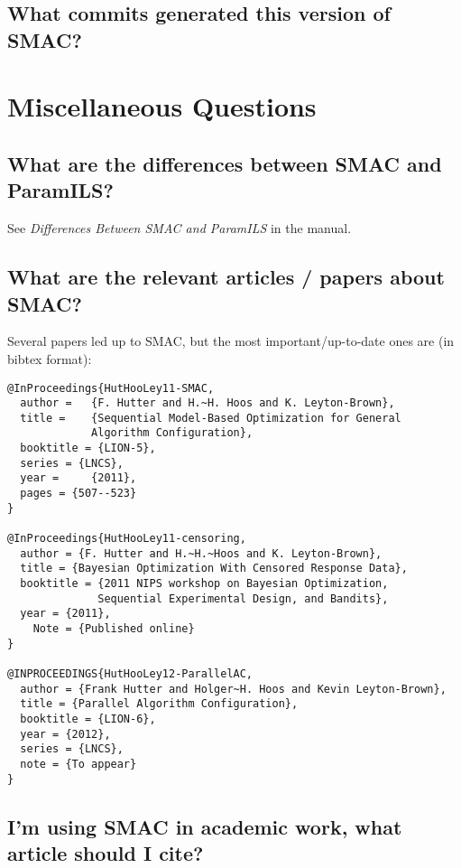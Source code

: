 \documentclass[11pt,letterpaper,oneside]{article}
\begin{document}
\subsection{What commits generated this version of SMAC?}



\section{Miscellaneous Questions}

\subsection{What are the differences between SMAC and ParamILS?}

	See \emph{Differences Between SMAC and ParamILS} in the manual.


\subsection{What are the relevant articles / papers about SMAC?}

Several papers led up to SMAC, but the most important/up-to-date ones are (in bibtex format):
\begin{verbatim}
@InProceedings{HutHooLey11-SMAC,
  author =	 {F. Hutter and H.~H. Hoos and K. Leyton-Brown},
  title =	 {Sequential Model-Based Optimization for General 
             Algorithm Configuration},
  booktitle = {LION-5},
  series = {LNCS},
  year =	 {2011},
  pages = {507--523}
}

@InProceedings{HutHooLey11-censoring,
  author = {F. Hutter and H.~H.~Hoos and K. Leyton-Brown},
  title = {Bayesian Optimization With Censored Response Data},
  booktitle = {2011 NIPS workshop on Bayesian Optimization, 
              Sequential Experimental Design, and Bandits},
  year = {2011},
	Note = {Published online}
}

@INPROCEEDINGS{HutHooLey12-ParallelAC,
  author = {Frank Hutter and Holger~H. Hoos and Kevin Leyton-Brown},
  title = {Parallel Algorithm Configuration},
  booktitle = {LION-6},
  year = {2012},
  series = {LNCS},
  note = {To appear}
}
\end{verbatim}



\subsection{I'm using SMAC in academic work, what article should I cite?}
\end{document}
